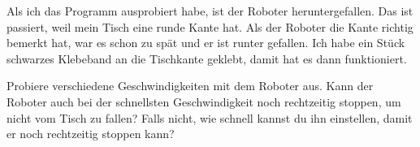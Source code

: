 Als ich das Programm ausprobiert habe, ist der Roboter heruntergefallen. Das ist
passiert, weil mein Tisch eine runde Kante hat. Als der Roboter die Kante
richtig bemerkt hat, war es schon zu spät und er ist runter gefallen. Ich habe
ein Stück schwarzes Klebeband an die Tischkante geklebt, damit hat es dann
funktioniert.


Probiere verschiedene Geschwindigkeiten mit dem Roboter aus. Kann der Roboter
auch bei der schnellsten Geschwindigkeit noch rechtzeitig stoppen, um nicht vom
Tisch zu fallen? Falls nicht, wie schnell kannst du ihn einstellen, damit er
noch rechtzeitig stoppen kann?

